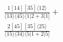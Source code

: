 \documentclass[varwidth, border=5pt]{standalone}
\begin{document}
\begin{my}
$\begin{gathered}
\scriptscriptstyle\frac{1[14][35]⟨12⟩}{⟨13⟩⟨45⟩⟨1|2+3|1]}+\\
\scriptscriptstyle\frac{2[45][35]⟨25⟩}{⟨15⟩⟨34⟩⟨5|1+2|5]}\phantom{+}
\end{gathered}$
\end{my}
\end{document}
